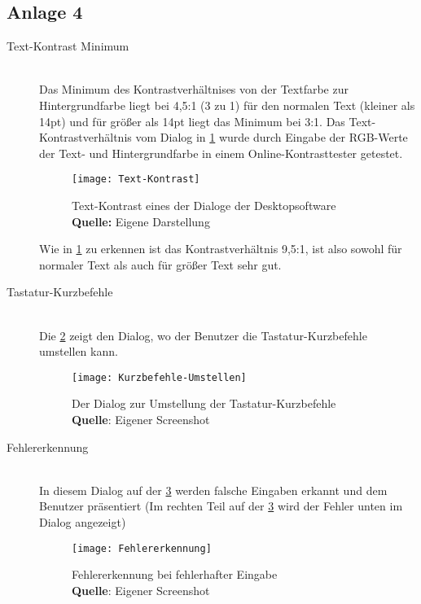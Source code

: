 \subsection*{Anlage 4}
\label{subsec: Anlage4}

\begin{description}
	\item[Text-Kontrast Minimum] \hfill \\
	Das Minimum des Kontrastverhältnises von der Textfarbe zur Hintergrundfarbe liegt bei 4,5:1 (3 zu 1) für den normalen Text (kleiner als 14pt) und für größer als 14pt liegt das Minimum bei 3:1. 
	Das Text-Kontrastverhältnis vom Dialog in \cref{fig: Text-Kontrast} wurde durch Eingabe der RGB-Werte der Text- und Hintergrundfarbe in einem Online-Kontrasttester getestet.
	
	\begin{figure}[H]
		\centering
		\texttt{[image: Text-Kontrast]}
		\caption[Text-Kontrast eines der Dialoge der Desktopsoftware]{Text-Kontrast eines der Dialoge der Desktopsoftware\\\textbf{Quelle:} Eigene Darstellung}
		\label{fig: Text-Kontrast}
	\end{figure}
	
	Wie in \cref{fig: Text-Kontrast} zu erkennen ist das Kontrastverhältnis 9,5:1, ist also sowohl für normaler Text als auch für größer Text sehr gut.
	
	\item[Tastatur-Kurzbefehle] \hfill \\
	Die \cref{fig: Kurzbefehle-Umstellen} zeigt den Dialog, wo der Benutzer die Tastatur-Kurzbefehle umstellen kann.
	
	\begin{figure}[H]
		\centering
		\texttt{[image: Kurzbefehle-Umstellen]}
		\caption[Der Dialog zur Umstellung der Tastatur-Kurzbefehle]{Der Dialog zur Umstellung der Tastatur-Kurzbefehle\\\textbf{Quelle}: Eigener Screenshot}
		\label{fig: Kurzbefehle-Umstellen}
	\end{figure}
	
	\item[Fehlererkennung] \hfill \\
	In diesem Dialog auf der \cref{fig: Fehlererkennung} werden falsche Eingaben erkannt und dem Benutzer präsentiert (Im rechten Teil auf der \cref{fig: Fehlererkennung} wird der 
	Fehler unten im Dialog angezeigt)
	
	\begin{figure}[H]
		\centering
		\texttt{[image: Fehlererkennung]}
		\caption[Fehlererkennung bei fehlerhafter Eingabe]{Fehlererkennung bei fehlerhafter Eingabe\\\textbf{Quelle}: Eigener Screenshot}
		\label{fig: Fehlererkennung}
	\end{figure}
	

\end{description}
